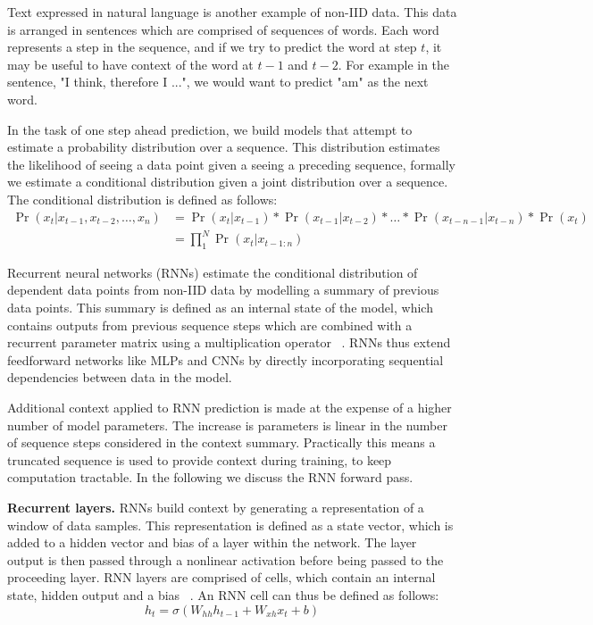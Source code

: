 \noindent Text expressed in natural language is another example of non-IID data. This data is arranged in sentences which are comprised of sequences of words. Each word represents a step in the sequence, and if we try to predict the word at step $ t $, it may be useful to have context of the word at $t -1$ and $t - 2$. For example in the sentence, "I think, therefore I ...", we would want to predict "am" as the next word. \par

\noindent In the task of one step ahead prediction, we build models that attempt to estimate a probability distribution over a sequence. This distribution estimates the likelihood of seeing a data point given a seeing a preceding sequence, formally we estimate a conditional distribution given a joint distribution over a sequence. The conditional distribution is defined as follows:
\begin{equation}
	\begin{split}
		\Pr( x_t | x_{t - 1},  x_{t - 2}, \dots,  x_n ) & = \Pr(x_t | x_{t - 1}) * \Pr(x_{t - 1}| x_{t - 2}) * \dots * \Pr(x_{t - n - 1}| x_{t - n}) * \Pr(x_t) \\
		& =\prod_{1}^N \Pr(x_t | x_{t - 1:n})
	\end{split}
\end{equation}

\noindent Recurrent neural networks (RNNs) estimate the conditional distribution of dependent data points from non-IID data by modelling a summary of previous data points. This summary is defined as an internal state of the model, which contains outputs from previous sequence steps which are combined with a recurrent parameter matrix using a multiplication operator \unskip ~\citep{werbos1988generalization}. RNNs thus extend feedforward networks like MLPs and CNNs by directly incorporating sequential dependencies between data in the model. \par

\noindent Additional context applied to RNN prediction is made at the expense of a higher number of model parameters. The increase is parameters is linear in the number of sequence steps considered in the context summary. Practically this means a truncated sequence is used to provide context during training, to keep computation tractable. In the following we discuss the RNN forward pass. \par

\noindent \textbf{Recurrent layers.} RNNs build context by generating a representation of a window of data samples. This representation is defined as a state vector, which is added to a hidden vector and bias of a layer within the network. The layer output is then passed through a nonlinear activation before being passed to the proceeding layer. RNN layers are comprised of cells, which contain an internal state, hidden output and a bias \unskip ~\citep{DLIndaba2018}. An RNN cell can thus be defined as follows: 
\begin{equation}
	h_t = \sigma(W_{hh}h_{t-1} + W_{xh}x_t + b)
\end{equation}

